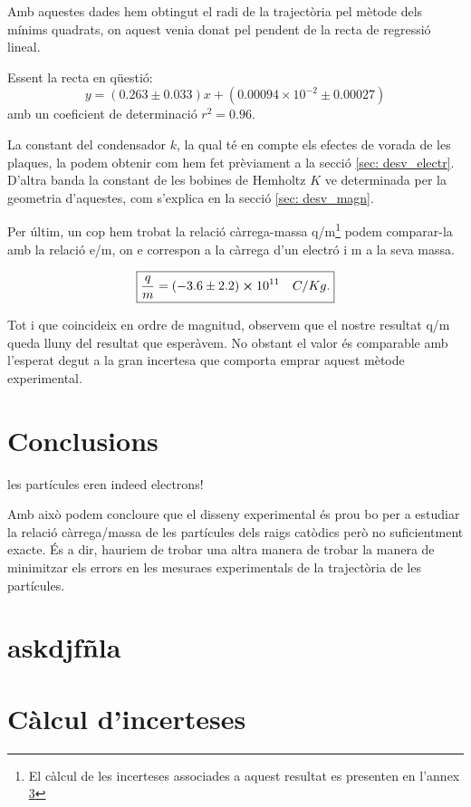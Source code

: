 \documentclass[11pt]{article}
\begin{document}
Amb aquestes dades hem obtingut el radi de la trajectòria pel mètode dels mínims quadrats, on aquest venia donat pel pendent de la recta de regressió lineal.

Essent la recta en qüestió: 
\begin{equation}
    y=(0.263 \pm 0.033)x + (0.00094\times10^{-2} \pm 0.00027)
\end{equation}  
amb un coeficient de determinació $r^2=0.96$.

La constant del condensador $k$, la qual té en compte els efectes de vorada de les plaques, la podem obtenir com hem fet prèviament a la secció \ref{sec: desv_electr}. D'altra banda la constant de les bobines de Hemholtz $K$ ve determinada per la geometria d'aquestes, com s'explica en la secció \ref{sec: desv_magn}.

Per últim, un cop hem trobat la relació càrrega-massa q/m\footnote{El càlcul de les incerteses associades a aquest resultat es presenten en l'annex \ref{sec: incerteses}} podem comparar-la amb la relació e/m, on e correspon a la càrrega d'un electró i m a la seva massa.

\[
\boxed{\frac{q}{m}=(-3.6\pm2.2)\cross10^{11}\quad C/Kg.}
\] 

Tot i que coincideix en ordre de magnitud, observem que el nostre resultat q/m queda lluny del resultat que esperàvem. No obstant el valor és comparable amb l'esperat degut a la gran incertesa que comporta emprar aquest mètode experimental. 

\section{Conclusions}
les partícules eren indeed electrons!

Amb això podem concloure que el disseny experimental és prou bo per a estudiar la relació càrrega/massa de les partícules dels raigs catòdics però no suficientment exacte. És a dir, hauriem de trobar una altra manera de trobar la manera de minimitzar els errors en les mesuraes experimentals de la trajectòria de les partícules.

\section{askdjfñla}

\section{Càlcul d'incerteses}\label{sec: incerteses}
\end{document}
